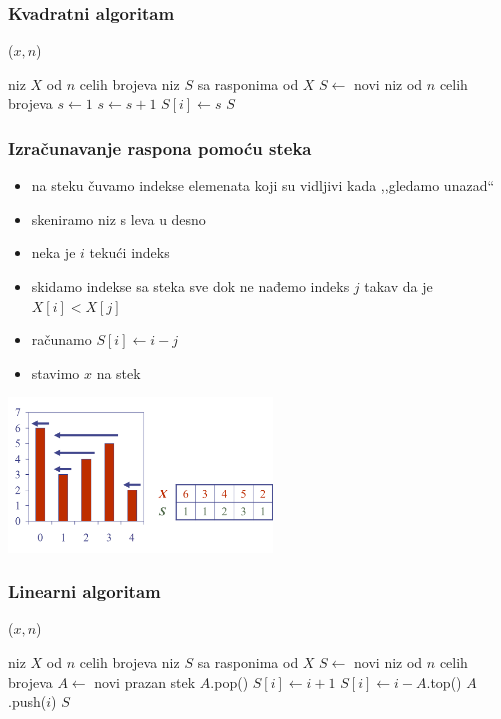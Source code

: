 \documentclass[compress]{beamer}
\begin{document}
\begin{frame}[fragile]
  \frametitle{Kvadratni algoritam}
($x, n$)
\begin{algorithmic}
\REQUIRE niz $X$ od $n$ celih brojeva
\ENSURE niz $S$ sa rasponima od $X$
\STATE $S \leftarrow$ novi niz od $n$ celih brojeva
  \STATE $s\leftarrow 1$
    \STATE $s\leftarrow s+1$
  \ENDWHILE
  \STATE $S[i]\leftarrow s$
  \RETURN $S$
\ENDFOR
\end{algorithmic}
\end{frame}

\begin{frame}[fragile]
  \frametitle{Izračunavanje raspona pomoću steka}
  \begin{itemize}
    \item na steku čuvamo indekse elemenata koji su vidljivi kada ,,gledamo unazad``
    \item skeniramo niz s leva u desno
    \item neka je $i$ tekući indeks
    \item skidamo indekse sa steka sve dok ne nađemo indeks $j$ takav da je $X[i]<X[j]$
    \item računamo $S[i]\leftarrow i-j$
    \item stavimo $x$ na stek
  \end{itemize}
  \begin{center}
    \includegraphics[width=7cm]{asp-05-pic06.png}
  \end{center}
\end{frame}

\begin{frame}[fragile,shrink=5]
  \frametitle{Linearni algoritam}
($x, n$)
\begin{algorithmic}
\REQUIRE niz $X$ od $n$ celih brojeva
\ENSURE niz $S$ sa rasponima od $X$
\STATE $S \leftarrow$ novi niz od $n$ celih brojeva
\STATE $A \leftarrow$ novi prazan stek
    \STATE $A$.pop()
  \ENDWHILE
    \STATE $S[i]\leftarrow i+1$
  \ELSE
    \STATE $S[i]\leftarrow i-A$.top()
  \ENDIF
  \STATE $A$.push($i$)  
\ENDFOR
\RETURN $S$
\end{algorithmic}
\end{frame}
\end{document}
